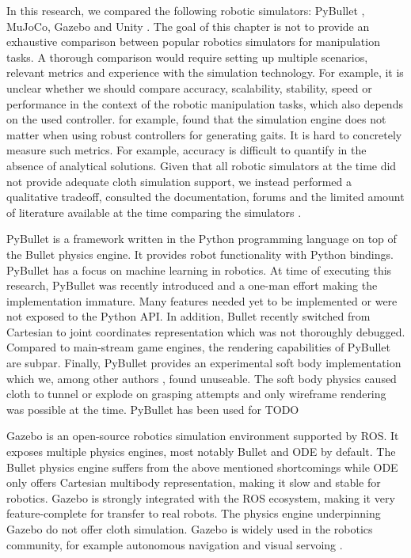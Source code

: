\documentclass[\home/main.tex]{subfiles}
\begin{document}
In this research, we compared the following robotic simulators: PyBullet \autocite{pybullet}, MuJoCo, Gazebo and Unity \autocite{Unity}. The goal of this chapter is not to provide an exhaustive comparison between popular robotics simulators for manipulation tasks. A thorough comparison would require setting up multiple scenarios, relevant metrics and experience with the simulation technology. For example, it is unclear whether we should compare accuracy, scalability, stability, speed or performance in the context of the robotic manipulation tasks, which also depends on the used controller. \textcite{Giovanni2011} for example, found that the simulation engine does not matter when using robust controllers for generating gaits. It is hard to concretely measure such metrics. For example, accuracy is difficult to quantify in the absence of analytical solutions.
Given that all robotic simulators at the time did not provide adequate cloth simulation support, we instead performed a qualitative tradeoff, consulted the documentation, forums and the limited amount of literature available at the time comparing the simulators \autocite{staranowicz2011survey,Erez2015}.

PyBullet is a framework written in the Python programming language on top of the Bullet physics engine. It provides robot functionality with Python bindings. PyBullet has a focus on machine learning in robotics. At time of executing this research, PyBullet was recently introduced and a one-man effort making the implementation immature. Many features needed yet to be implemented or were not exposed to the Python API. In addition, Bullet recently switched from Cartesian to joint coordinates representation which was not thoroughly debugged. Compared to main-stream game engines, the rendering capabilities of PyBullet are subpar. Finally, PyBullet provides an experimental soft body implementation which we, among other authors \autocite{Matas2018, seita2021learning}, found unuseable. The soft body physics caused cloth to tunnel or explode on grasping attempts and only wireframe rendering was possible at the time. PyBullet has been used for TODO

Gazebo is an open-source robotics simulation environment supported by ROS. It exposes multiple physics engines, most notably Bullet and ODE by default. The Bullet physics engine suffers from the above mentioned shortcomings while ODE only offers Cartesian multibody representation, making it slow and stable for robotics. Gazebo is strongly integrated with the ROS ecosystem, making it very feature-complete for transfer to real robots. The physics engine underpinning Gazebo do not offer cloth simulation. Gazebo is widely used in the robotics community, for example autonomous navigation \autocite{93} and visual servoing \autocite{96}.
\end{document}
